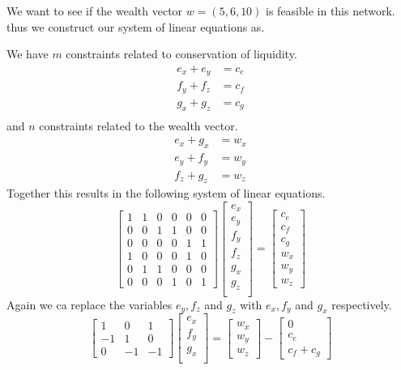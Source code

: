 \documentclass[10pt,twocolumn]{article}
\begin{document}
We want to see if the wealth vector $w=(5,6,10)$ is feasible in this network.
thus we construct our system of linear equations as.

We have $m$ constraints related to conservation of liquidity.
\begin{align*}
  e_x + e_y  & = c_e \\
  f_y + f_z & = c_f \\
  g_x + g_z & = c_g \\
\end{align*}
and $n$ constraints related to the wealth vector.
\begin{align*}
  e_x +  g_x & = w_x \\
  e_y +  f_y & = w_y \\
  f_z +  g_z & = w_z
\end{align*}
Together this results in the following system of linear equations.
\[
  \left[
    \begin{array}{cccccc}
      1 & 1 & 0 & 0 & 0 & 0 \\
      0 & 0 & 1 & 1 & 0 & 0 \\
      0 & 0 & 0 & 0 & 1 & 1 \\
      1 & 0 & 0 & 0 & 1 & 0 \\
      0 & 1 & 1 & 0 & 0 & 0 \\
      0 & 0 & 0 & 1 & 0 & 1 
    \end{array}
    \right]
\begin{bmatrix}
  e_{x}  \\
  e_{y}  \\
  f_{y}  \\
  f_{z}  \\
  g_{x}  \\
  g_{z}  \\
\end{bmatrix} 
  = \begin{bmatrix}
  c_e\\
  c_f\\
  c_g\\
  w_x\\
  w_y\\
  w_z
\end{bmatrix}
\]
Again we ca replace the variables $e_y, f_z$ and $g_z$ with $e_x, f_y$ and $g_x$ respectively. 
\[
  \left[
    \begin{array}{ccc}
      1 & 0 & 1 \\
      - 1& 1 & 0 \\
      0 & -1 & -1 
    \end{array}
    \right]
\begin{bmatrix}
  e_{x}  \\
  f_{y}  \\
  g_{x}  \\
\end{bmatrix} 
  = \begin{bmatrix}
  w_x\\
  w_y\\
  w_z
  \end{bmatrix}
  - \begin{bmatrix}
  0\\
  c_e\\
  c_f + c_g
  \end{bmatrix}
\]
\end{document}
